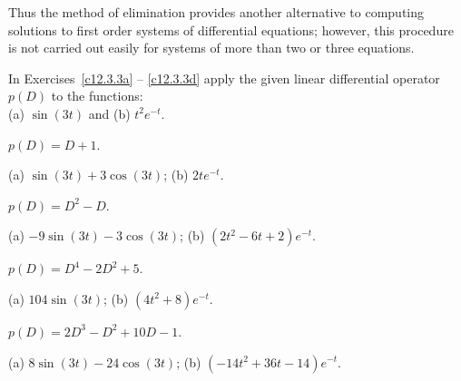 \documentclass{ximera}
\begin{document}
Thus the method of elimination provides another alternative to computing 
solutions to first order systems of differential equations; however, this 
procedure is not carried out easily for systems of more than two or three 
equations.


\EXER

\TEXER

\noindent In Exercises~\ref{c12.3.3a} -- \ref{c12.3.3d} apply the given
linear differential operator $p(D)$ to the functions: \\
(a) $\sin(3t)$ and  (b) $t^2 e^{-t}$.
\begin{exercise} \label{c12.3.3a}
$p(D) = D+1$.

\begin{solution}
\ans (a) $\sin(3t)+3\cos(3t)$; (b) $2te^{-t}$.

\end{solution}
\end{exercise}
\begin{exercise} \label{c12.3.3b}
$p(D) = D^2-D$.

\begin{solution}
\ans (a) $-9\sin(3t)-3\cos(3t)$; (b) $(2t^2-6t+2)e^{-t}$.

\end{solution}
\end{exercise}
\begin{exercise} \label{c12.3.3c}
$p(D) = D^4-2D^2+5$.

\begin{solution}
\ans (a) $104\sin(3t)$; (b) $(4t^2+8)e^{-t}$.

\end{solution}
\end{exercise}
\begin{exercise} \label{c12.3.3d}
$p(D) = 2D^3-D^2+10D-1$.

\begin{solution}
\ans (a) $8\sin(3t)-24\cos(3t)$; (b) $(-14t^2+36t-14)e^{-t}$.


\end{solution}
\end{exercise}
\end{document}
